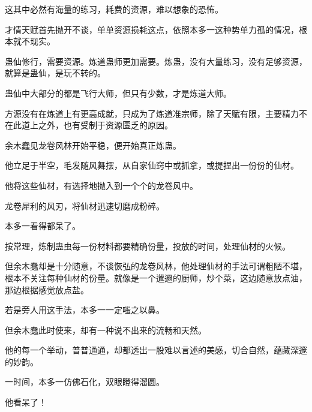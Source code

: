 \begin{this_body}
这其中必然有海量的练习，耗费的资源，难以想象的恐怖。

才情天赋首先抛开不谈，单单资源损耗这点，依照本多一这种势单力孤的情况，根本就不现实。

蛊仙修行，需要资源。炼道蛊师更加需要。炼蛊，没有大量练习，没有足够资源，就算是蛊仙，是玩不转的。

蛊仙中大部分的都是飞行大师，但只有少数，才是炼道大师。

方源没有在炼道上有更高成就，只成为了炼道准宗师，除了天赋有限，主要精力不在此道上之外，也有受制于资源匮乏的原因。

余木蠢见龙卷风林开始平稳，便开始真正炼蛊。

他立足于半空，毛发随风舞摆，从自家仙窍中或抓拿，或提捏出一份份的仙材。

他将这些仙材，有选择地抛入到一个个的龙卷风中。

龙卷犀利的风刃，将仙材迅速切磨成粉碎。

本多一看得都呆了。

按常理，炼制蛊虫每一份材料都要精确份量，投放的时间，处理仙材的火候。

但余木蠢却是十分随意，不谈恢弘的龙卷风林，他处理仙材的手法可谓粗陋不堪，根本不关注每种仙材的份量。就像是一个邋遢的厨师，炒个菜，这边随意放点油，那边根据感觉放点盐。

若是旁人用这手法，本多一一定嗤之以鼻。

但余木蠢此时使来，却有一种说不出来的流畅和天然。

他的每一个举动，普普通通，却都透出一股难以言述的美感，切合自然，蕴藏深邃的妙韵。

一时间，本多一仿佛石化，双眼瞪得溜圆。

他看呆了！

\end{this_body}

